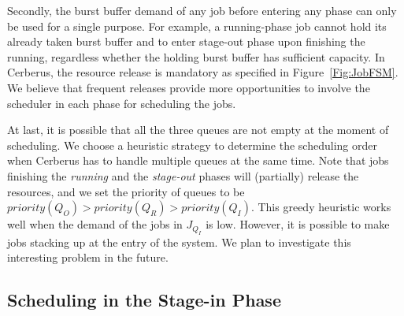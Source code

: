 Secondly,  the burst buffer demand of any job before entering any phase can only be used for a single purpose.
For example, a running-phase job cannot hold its already taken burst buffer
and to enter stage-out phase upon finishing the running, regardless whether the holding burst buffer has sufficient capacity.
In Cerberus, the resource release is mandatory as specified in Figure~\ref{Fig:JobFSM}.
We believe that frequent releases provide more opportunities to involve the scheduler in each phase for scheduling the jobs.

At last, it is possible that all the three queues are not empty at the moment of scheduling.
We choose a heuristic strategy to determine the scheduling order when
Cerberus has to handle multiple queues at the same time.
Note that jobs finishing the \textit{running} and the \textit{stage-out} phases
will (partially) release the resources, and we set the priority of queues to be $priority(Q_O) > priority(Q_R) > priority(Q_I)$.
This greedy heuristic works well when the demand of the jobs in $J_{Q_I}$ is low.
However, it is possible to make jobs stacking up at the entry of the system.
We plan to investigate this interesting problem in the future.



\subsection{Scheduling in the Stage-in Phase}
\label{SubSec:OptStageIn}

